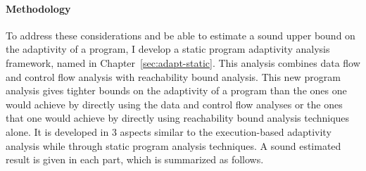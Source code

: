 \paragraph{Methodology}
To address these considerations and be able to estimate a sound upper bound on the adaptivity of a program, 
I develop a static program adaptivity analysis framework, named {\THESYSTEM} in Chapter~\ref{sec:adapt-static}.
This analysis combines data flow and control flow analysis with reachability bound analysis.
This new program analysis gives tighter bounds on the adaptivity of a program than the ones one would achieve 
by directly using the data and control flow analyses or the ones that one would achieve 
by directly using reachability bound analysis techniques alone. 
It is developed in 3 aspects similar to the execution-based adaptivity analysis 
while through static program analysis techniques. 
A sound estimated result is given in each part, which is summarized as follows.
